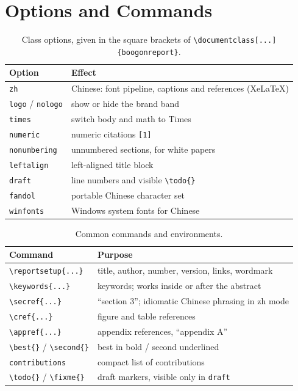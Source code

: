 \section{Options and Commands}
\label{app:cheatsheet}

\begin{table}[htbp]
  \centering
  \small
  \caption{Class options, given in the square brackets of
  \texttt{\textbackslash documentclass[...]\{boogonreport\}}.}
  \label{tab:options}
  \begin{tabular}{@{}ll@{}}
    \toprule
    Option & Effect \\
    \midrule
    \texttt{zh}          & Chinese: font pipeline, captions and references (XeLaTeX) \\
    \texttt{logo} / \texttt{nologo} & show or hide the brand band \\
    \texttt{times}       & switch body and math to Times \\
    \texttt{numeric}     & numeric citations \texttt{[1]} \\
    \texttt{nonumbering} & unnumbered sections, for white papers \\
    \texttt{leftalign}   & left-aligned title block \\
    \texttt{draft}       & line numbers and visible \verb|\todo{}| \\
    \texttt{fandol}      & portable Chinese character set \\
    \texttt{winfonts}    & Windows system fonts for Chinese \\
    \bottomrule
  \end{tabular}
\end{table}

\begin{table}[htbp]
  \centering
  \small
  \caption{Common commands and environments.}
  \label{tab:commands}
  \begin{tabular}{@{}ll@{}}
    \toprule
    Command & Purpose \\
    \midrule
    \verb|\reportsetup{...}| & title, author, number, version, links, wordmark \\
    \verb|\keywords{...}|    & keywords; works inside or after the abstract \\
    \verb|\secref{...}|      & ``section 3''; idiomatic Chinese phrasing in zh mode \\
    \verb|\cref{...}|        & figure and table references \\
    \verb|\appref{...}|      & appendix references, ``appendix A'' \\
    \verb|\best{}| / \verb|\second{}| & best in bold / second underlined \\
    \texttt{contributions}   & compact list of contributions \\
    \verb|\todo{}| / \verb|\fixme{}| & draft markers, visible only in \texttt{draft} \\
    \bottomrule
  \end{tabular}
\end{table}

